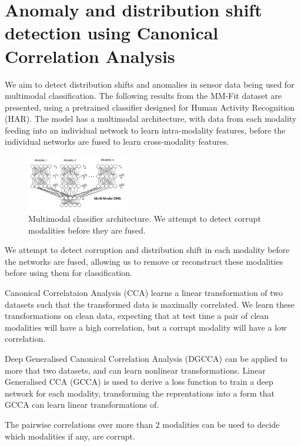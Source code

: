 \chapter{Anomaly and distribution shift detection using Canonical Correlation Analysis}

We aim to detect distribution shifts and anomalies in sensor data being used for multimodal classification. The following results from the MM-Fit dataset are presented, using a pretrained classifier designed for Human Activity Recognition (HAR). The model has a multimodal architecture, with data from each modality feeding into an individual network to learn intra-modality features, before the individual networks are fused to learn cross-modality features. 

\begin{figure}[H]
    \centering
    \includegraphics[width=0.4\textwidth]{images/mm_dnn.png}
    \caption{Multimodal classifier architecture. We attempt to detect corrupt modalities before they are fused.}
    \label{fig:mm_dnn}
\end{figure}

We attempt to detect corruption and distribution shift in each modality before the networks are fused, allowing us to remove or reconstruct these modalities before using them for classification. 

Canonical Correlataion Analysis (CCA) learns a linear transformation of two datasets such that the transformed data is maximally correlated. We learn these transformations on clean data, expecting that at test time a pair of clean modalities will have a high correlation, but a corrupt modality will have a low correlation.

Deep Generalised Canonical Correlation Analysis (DGCCA) can be applied to more that two datasets, and can learn nonlinear transformations. Linear Generalised CCA (GCCA) is used to derive a loss function to train a deep network for each modality, transforming the reprentations into a form that GCCA can learn linear transformations of.

The pairwise correlations over more than 2 modalities can be used to decide which modalities if any, are corrupt. 

